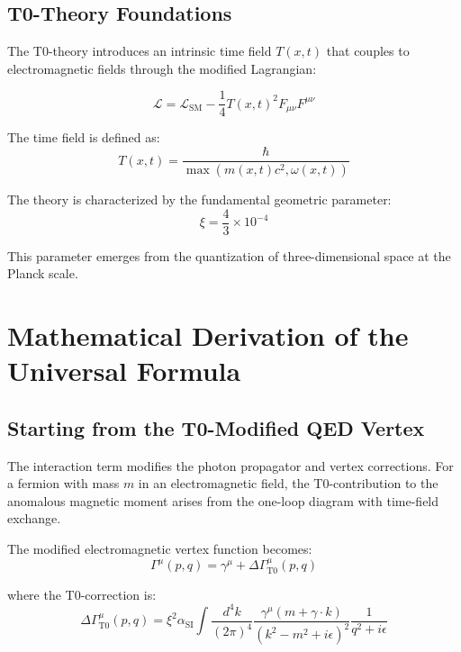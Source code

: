 \documentclass[12pt,a4paper]{article}
\newcommand{\xipar}{\xi}
\newcommand{\alphaSI}{\alpha_{\text{SI}}}
\newcommand{\calL}{\mathcal{L}}
\begin{document}
	\subsection{T0-Theory Foundations}
	
	The T0-theory introduces an intrinsic time field $T(x,t)$ that couples to electromagnetic fields through the modified Lagrangian:
	
	\begin{equation}
		\calL = \calL_{\text{SM}} - \frac{1}{4}T(x,t)^2 F_{\mu\nu}F^{\mu\nu}
	\end{equation}
	
	The time field is defined as:
	\begin{equation}
		T(x,t) = \frac{\hbar}{\max(m(x,t)c^2, \omega(x,t))}
	\end{equation}
	
	The theory is characterized by the fundamental geometric parameter:
	\begin{equation}
		\xipar = \frac{4}{3} \times 10^{-4}
	\end{equation}
	
	This parameter emerges from the quantization of three-dimensional space at the Planck scale.
	
	\section{Mathematical Derivation of the Universal Formula}
	
	\subsection{Starting from the T0-Modified QED Vertex}
	
	The interaction term modifies the photon propagator and vertex corrections. For a fermion with mass $m$ in an electromagnetic field, the T0-contribution to the anomalous magnetic moment arises from the one-loop diagram with time-field exchange.
	
	The modified electromagnetic vertex function becomes:
	\begin{equation}
		\Gamma^\mu(p,q) = \gamma^\mu + \Delta\Gamma^\mu_{\text{T0}}(p,q)
	\end{equation}
	
	where the T0-correction is:
	\begin{equation}
		\Delta\Gamma^\mu_{\text{T0}}(p,q) = \xipar^2 \alphaSI \int \frac{d^4k}{(2\pi)^4} \frac{\gamma^\mu (m + \gamma \cdot k)}{(k^2 - m^2 + i\epsilon)^2} \frac{1}{q^2 + i\epsilon}
	\end{equation}
	
\end{document}
